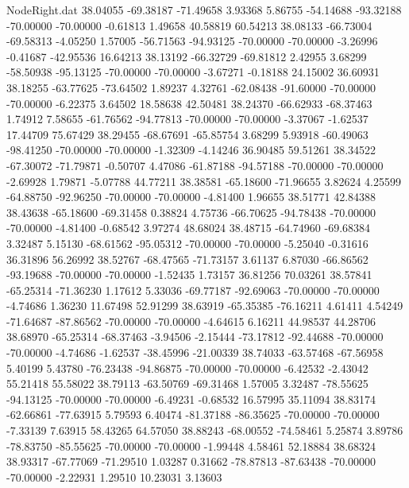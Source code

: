 \begin{filecontents}{NodeRight.dat}
  38.04055  -69.38187  -71.49658     3.93368    5.86755  -54.14688  -93.32188  -70.00000  -70.00000   -0.61813    1.49658   40.58819   60.54213
  38.08133  -66.73004  -69.58313    -4.05250    1.57005  -56.71563  -94.93125  -70.00000  -70.00000   -3.26996   -0.41687  -42.95536   16.64213
  38.13192  -66.32729  -69.81812     2.42955    3.68299  -58.50938  -95.13125  -70.00000  -70.00000   -3.67271   -0.18188   24.15002   36.60931
  38.18255  -63.77625  -73.64502     1.89237    4.32761  -62.08438  -91.60000  -70.00000  -70.00000   -6.22375    3.64502   18.58638   42.50481
  38.24370  -66.62933  -68.37463     1.74912    7.58655  -61.76562  -94.77813  -70.00000  -70.00000   -3.37067   -1.62537   17.44709   75.67429
  38.29455  -68.67691  -65.85754     3.68299    5.93918  -60.49063  -98.41250  -70.00000  -70.00000   -1.32309   -4.14246   36.90485   59.51261
  38.34522  -67.30072  -71.79871    -0.50707    4.47086  -61.87188  -94.57188  -70.00000  -70.00000   -2.69928    1.79871   -5.07788   44.77211
  38.38581  -65.18600  -71.96655     3.82624    4.25599  -64.88750  -92.96250  -70.00000  -70.00000   -4.81400    1.96655   38.51771   42.84388
  38.43638  -65.18600  -69.31458     0.38824    4.75736  -66.70625  -94.78438  -70.00000  -70.00000   -4.81400   -0.68542    3.97274   48.68024
  38.48715  -64.74960  -69.68384     3.32487    5.15130  -68.61562  -95.05312  -70.00000  -70.00000   -5.25040   -0.31616   36.31896   56.26992
  38.52767  -68.47565  -71.73157     3.61137    6.87030  -66.86562  -93.19688  -70.00000  -70.00000   -1.52435    1.73157   36.81256   70.03261
  38.57841  -65.25314  -71.36230     1.17612    5.33036  -69.77187  -92.69063  -70.00000  -70.00000   -4.74686    1.36230   11.67498   52.91299
  38.63919  -65.35385  -76.16211     4.61411    4.54249  -71.64687  -87.86562  -70.00000  -70.00000   -4.64615    6.16211   44.98537   44.28706
  38.68970  -65.25314  -68.37463    -3.94506   -2.15444  -73.17812  -92.44688  -70.00000  -70.00000   -4.74686   -1.62537  -38.45996  -21.00339
  38.74033  -63.57468  -67.56958     5.40199    5.43780  -76.23438  -94.86875  -70.00000  -70.00000   -6.42532   -2.43042   55.21418   55.58022
  38.79113  -63.50769  -69.31468     1.57005    3.32487  -78.55625  -94.13125  -70.00000  -70.00000   -6.49231   -0.68532   16.57995   35.11094
  38.83174  -62.66861  -77.63915     5.79593    6.40474  -81.37188  -86.35625  -70.00000  -70.00000   -7.33139    7.63915   58.43265   64.57050
  38.88243  -68.00552  -74.58461     5.25874    3.89786  -78.83750  -85.55625  -70.00000  -70.00000   -1.99448    4.58461   52.18884   38.68324
  38.93317  -67.77069  -71.29510     1.03287    0.31662  -78.87813  -87.63438  -70.00000  -70.00000   -2.22931    1.29510   10.23031    3.13603

\end{filecontents}
